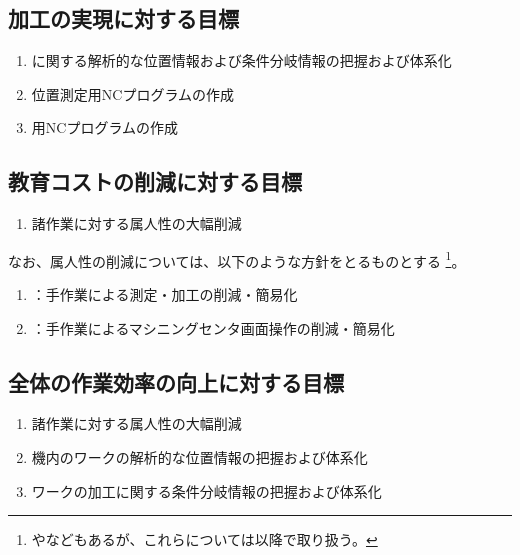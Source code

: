 \subsection{\Dimple 加工の実現に対する目標}
\begin{enumerate}[label=\sarrow]
\item \Dimple に関する解析的な位置情報および条件分岐情報の把握および体系化
\item \Dimple 位置測定用NCプログラムの作成
\item \DimpleMilling 用NCプログラムの作成
\end{enumerate}


\subsection{教育コストの削減に対する目標}
\begin{enumerate}[label=\sarrow]
\item 諸作業に対する属人性の大幅削減
\end{enumerate}
なお、属人性の削減については、以下のような方針をとるものとする
\footnote{やなどもあるが、これらについては以降で取り扱う。}。
\begin{enumerate}[label=\sarrow]
\item {}：手作業による測定・加工の削減・簡易化
\item {}：手作業によるマシニングセンタ画面操作の削減・簡易化
\end{enumerate}


\subsection{全体の作業効率の向上に対する目標}
\begin{enumerate}[label=\sarrow]
\item 諸作業に対する属人性の大幅削減
\item 機内のワークの解析的な位置情報の把握および体系化
\item ワークの加工に関する条件分岐情報の把握および体系化
\end{enumerate}


